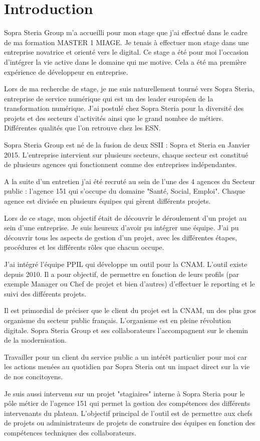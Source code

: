 \chapter*{Introduction}
\label{chap:introduction}

Sopra Steria Group m'a accueilli pour mon stage que j'ai effectué dans le cadre de ma formation MASTER 1 MIAGE. Je tenais à effectuer mon stage dans une entreprise novatrice et orienté vers le digital. Ce stage a été pour moi l'occasion d'intégrer la vie active dans le domaine qui me motive. Cela a été ma première expérience de développeur en entreprise.

Lors de ma recherche de stage, je me suis naturellement tourné vers Sopra Steria, entreprise de service numérique qui est un des leader européen de la transformation numérique.
J'ai postulé chez Sopra Steria pour la diversité des projets et des secteurs d'activités ainsi que le grand nombre de métiers. Différentes qualités que l'on retrouve chez les ESN. 

Sopra Steria Group est né de la fusion de deux SSII : Sopra et Steria en Janvier 2015.
L'entreprise intervient sur plusieurs secteurs, chaque secteur est constitué de plusieurs agences qui fonctionnent comme des entreprises indépendantes. 

A la suite d’un entretien j'ai été recruté au sein de l’une des 4 agences du Secteur public : l’agence 151 qui s’occupe du domaine "Santé, Social, Emploi".
Chaque agence est divisée en plusieurs équipes qui gèrent différents projets.

Lors de ce stage, mon objectif était de découvrir le déroulement d'un projet au sein d'une entreprise. Je suis heureux d'avoir pu intégrer une équipe. J'ai pu découvrir tous les aspects de gestion d'un projet, avec les différentes étapes, procédures et les différents rôles que chacun occupe.

J'ai intégré l'équipe PPIL qui développe un outil pour la CNAM. L'outil existe depuis 2010. Il a pour objectif, de permettre en fonction de leurs profils (par exemple Manager ou Chef de projet et bien d'autres) d'effectuer le reporting et le suivi des différents projets. 

Il est primordial de préciser que le client du projet est la CNAM, un des plus gros organisme du secteur public français. L'organisme est en pleine révolution digitale. Sopra Steria Group et ses collaborateurs l’accompagnent sur le chemin de la modernisation.

Travailler pour un client du service public a un intérêt particulier pour moi car les actions menées au quotidien par Sopra Steria ont un impact direct sur la vie de nos concitoyens.

Je suis aussi intervenu sur un projet "stagiaires" interne à Sopra Steria pour le pôle métier de l'agence 151 qui permet la gestion des compétences des différents intervenants du plateau. L'objectif principal de l'outil est de permettre aux chefs de projets ou administrateurs de projets de construire des équipes en fonction des compétences techniques des collaborateurs.

